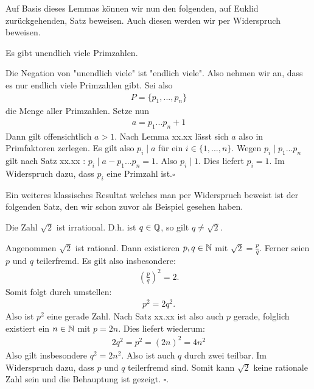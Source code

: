 Auf Basis dieses Lemmas können wir nun den folgenden, auf Euklid zurückgehenden, Satz beweisen. Auch diesen werden wir per Widerspruch beweisen. 

\begin{theorem}
    Es gibt unendlich viele Primzahlen. 
\end{theorem}

\begin{proof*}
    Die Negation von "unendlich viele" ist "endlich viele". Also nehmen wir an, dass es nur endlich viele Primzahlen gibt. Sei also 
    \begin{align*}
        P = \{p_1,...,p_n\}
    \end{align*}
    die Menge aller Primzahlen. Setze nun
    \begin{align*}
        a = p_1 ... p_n + 1 
    \end{align*}
    Dann gilt offensichtlich $a>1$. Nach Lemma xx.xx lässt sich $a$ also in Primfaktoren zerlegen. Es gilt also $p_i \mid a$ für ein $i \in \{1,...,n\}$. 
    Wegen $p_i \mid p_1 ... p_n$ gilt nach Satz xx.xx : $p_i \mid a - p_1 ... p_n = 1$. Also $p_i \mid 1$. Dies liefert $p_i = 1$. Im Widerspruch dazu, dass $p_i$ eine Primzahl ist.\hfill $\square$ 
\end{proof*}

Ein weiteres klassisches Resultat welches man per Widerspruch beweist ist der folgenden Satz, den wir schon zuvor als Beispiel gesehen haben. 
\begin{theorem}
    Die Zahl $\sqrt{2}$ ist irrational. D.h. ist $q \in \mathbb{Q}$, so gilt $q \neq \sqrt{2}$. 
\end{theorem}
\begin{proof*}
    Angenommen $\sqrt{2}$ ist rational. Dann existieren $p,q \in \mathbb{N}$ mit $\sqrt{2} = \frac{p}{q}$. Ferner seien $p$ und $q$ teilerfremd. 
    Es gilt also insbesondere: 
    \begin{align*}
        (\frac{p}{q})^2 = 2 . 
    \end{align*}
    Somit folgt durch umstellen: 
    \begin{align*}
        p^2 = 2q^2.
    \end{align*}
    Also ist $p^2$ eine gerade Zahl. Nach Satz xx.xx ist also auch $p$ gerade, folglich existiert ein $n \in \mathbb{N}$ mit $p = 2n$. 
    Dies liefert wiederum: 
    \begin{align*}
        2q^2 = p^2 = (2n)^2 = 4n^2
    \end{align*}
    Also gilt insbesondere $q^2 = 2n^2$. Also ist auch $q$ durch zwei teilbar. Im Widerspruch dazu, dass $p$ und $q$ teilerfremd sind. 
    Somit kann $\sqrt{2}$ keine rationale Zahl sein und die Behauptung ist gezeigt. \hfill $\square$. 

\end{proof*}

